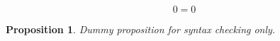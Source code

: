 \documentclass{article}
\newtheorem{proposition}[theorem]{Proposition}
\begin{document}
\begin{equation}
\label{eq:member-state-predictor}
0=0
\end{equation}

\begin{proposition}
\label{prop:paper-collapse-baseline}
Dummy proposition for syntax checking only.
\end{proposition}


\end{document}
